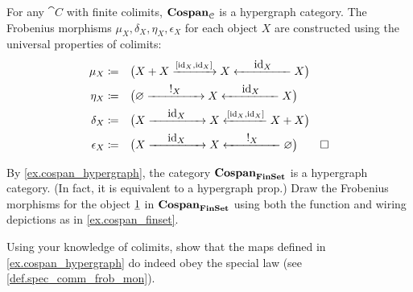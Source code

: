 \documentclass[7Sketches]{subfiles}
\begin{document}
\begin{example} %
\label{ex.cospan_hypergraph}%
%
For any $\cat C$ with finite colimits, $\mathbf{Cospan}_{\mathcal{C}}$ is a hypergraph category.
The Frobenius morphisms $\mu_X,\delta_X,\eta_X,\epsilon_X$ for each object $X$ are
constructed using the universal properties of colimits:
\begin{align*}
  \mu_X \coloneq&\quad\big(
  X+X 
  \xrightarrow{\copair{\id_X,\id_X}} X 
  \xleftarrow{\makebox[4.5em]{$\id_X$}} X \big)\\
  \eta_X \coloneq& \quad\big(
  \varnothing 
  \xrightarrow{\makebox[4.5em]{$!_X$}} X
  \xleftarrow{\makebox[4.5em]{$\id_X$}} X \big)\\
  \delta_X \coloneq&\quad\big(
  X 
  \xrightarrow{\makebox[4.5em]{$\id_X$}} X 
  \xleftarrow{\copair{\id_X,\id_X}} X+X \big)\\
  \epsilon_X \coloneq &\quad\big(
  X 
  \xrightarrow{\makebox[4.5em]{$\id_X$}} X 
  \xleftarrow{\makebox[4.5em]{$!_X$}} \varnothing\big)
  \qedhere
\end{align*}
\end{example}

\begin{exercise} %
\label{exc.frob_cospan}
  By \cref{ex.cospan_hypergraph}, the category $\mathbf{Cospan}_{\mathbf{FinSet}}$ is a hypergraph
  category. (In fact, it is equivalent to a hypergraph prop.) Draw the Frobenius
  morphisms for the object $\underline{1}$ in $\mathbf{Cospan}_{\mathbf{FinSet}}$ using both the function
  and wiring depictions as in \cref{ex.cospan_finset}.
\end{exercise}

\begin{exercise} %
\label{exc.frob_cospan2}
  Using your knowledge of colimits, show that the maps defined in
  \cref{ex.cospan_hypergraph} do indeed obey the special law (see
  \cref{def.spec_comm_frob_mon}).
%
\end{exercise}
\end{document}
